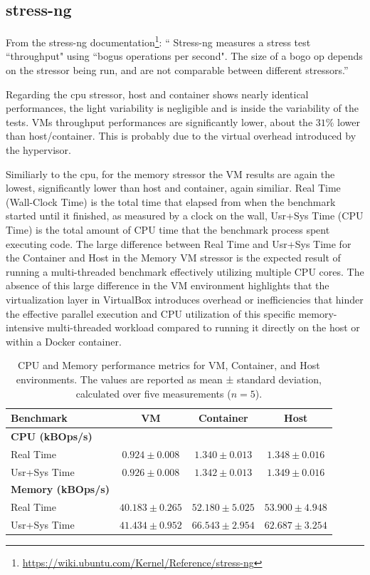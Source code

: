 \subsection{stress-ng}

From the stress-ng documentation\footnote{\url{https://wiki.ubuntu.com/Kernel/Reference/stress-ng}}: `` Stress-ng measures a stress test ``throughput" using ``bogus operations per second". The size of a bogo op depends on the stressor being run, and are not comparable between different stressors.''

Regarding the cpu stressor, host and container shows nearly identical performances, the light variability is negligible and is inside the variability of the tests. VMs throughput performances are significantly lower, about the $31\%$ lower than host/container. This is probably due to the virtual overhead introduced by the hypervisor.

Similiarly to the cpu, for the memory stressor the VM results are again the lowest, significantly lower than host and container, again similiar. 
Real Time (Wall-Clock Time) is the total time that elapsed from when the benchmark started until it finished, as measured by a clock on the wall, Usr+Sys Time (CPU Time) is the total amount of CPU time that the benchmark process spent executing code.
The large difference between Real Time and Usr+Sys Time for the Container and Host in the Memory VM stressor is the expected result of running a multi-threaded benchmark effectively utilizing multiple CPU cores. The absence of this large difference in the VM environment highlights that the virtualization layer in VirtualBox introduces overhead or inefficiencies that hinder the effective parallel execution and CPU utilization of this specific memory-intensive multi-threaded workload compared to running it directly on the host or within a Docker container.

\begin{table}[H]
    \centering
    \begin{tabular}{lccc}
    \toprule
    \textbf{Benchmark} & \textbf{VM} & \textbf{Container} & \textbf{Host} \\
    \midrule
    \textbf{CPU (kBOps/s)} & & & \\
    Real Time & $0.924 \pm 0.008$ & $1.340 \pm 0.013$ & $1.348 \pm 0.016$ \\
    Usr+Sys Time & $0.926 \pm 0.008$ & $1.342 \pm 0.013$ & $1.349 \pm 0.016$ \\
    \midrule
    \textbf{Memory (kBOps/s)} & & & \\
    Real Time & $40.183 \pm 0.265$ & $52.180 \pm 5.025$ & $53.900 \pm 4.948$ \\
    Usr+Sys Time & $41.434 \pm 0.952$ & $66.543 \pm 2.954$ & $62.687 \pm 3.254$ \\
    \bottomrule
    \end{tabular}
    \caption{CPU and Memory performance metrics for VM, Container, and Host environments. The values are reported as mean ± standard deviation, calculated over five measurements ($n = 5$).}
    \label{tab:stress-ng}
\end{table}
